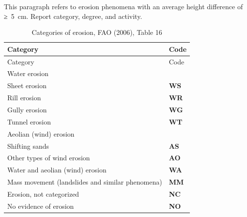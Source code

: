 \documentclass[
  letterpaper,
  DIV=11,
  numbers=noendperiod]{scrreprt}
\begin{document}
This paragraph refers to erosion phenomena with an average height
difference of ≥~5~cm. Report category, degree, and activity.

\begin{longtable}[]{@{}ll@{}}
\caption{Categories of erosion, FAO (2006), Table 16}\tabularnewline
\toprule()
Category & Code \\
\midrule()
\endfirsthead
\toprule()
Category & Code \\
\midrule()
\endhead
Water erosion & \\
Sheet erosion & \textbf{WS} \\
Rill erosion & \textbf{WR} \\
Gully erosion & \textbf{WG} \\
Tunnel erosion & \textbf{WT} \\
Aeolian (wind) erosion & \\
Shifting sands & \textbf{AS} \\
Other types of wind erosion & \textbf{AO} \\
Water and aeolian (wind) erosion & \textbf{WA} \\
Mass movement (landslides and similar phenomena) & \textbf{MM} \\
Erosion, not categorized & \textbf{NC} \\
No evidence of erosion & \textbf{NO} \\
\bottomrule()
\end{longtable}
\end{document}
